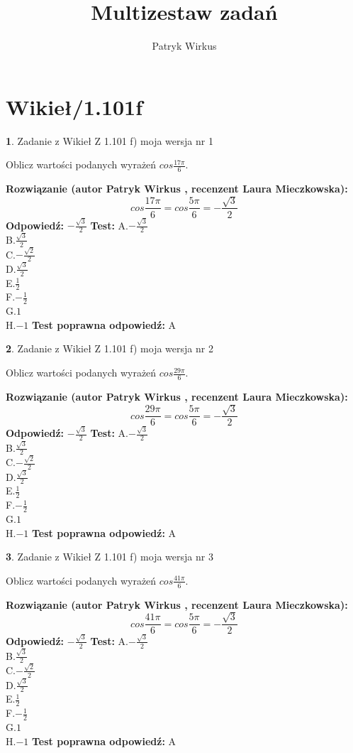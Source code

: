 \documentclass[12pt, a4paper]{article}
\title{Multizestaw zadań}
\author{Patryk Wirkus}
\date{}
\theoremstyle{definition} %
\newtheorem{zad}{}
\newcommand{\kategoria}[1]{\section{#1}}
\newcommand{\zadStart}[1]{\begin{zad}#1\newline}
\newcommand{\zadStop}{\end{zad}}
\newcommand{\rozwStart}[2]{\noindent \textbf{Rozwiązanie (autor #1 , recenzent #2): }\newline}
\newcommand{\rozwStop}{\newline}
\newcommand{\odpStart}{\noindent \textbf{Odpowiedź:}\newline}
\newcommand{\odpStop}{\newline}
\newcommand{\testStart}{\noindent \textbf{Test:}\newline}
\newcommand{\testStop}{\newline}
\newcommand{\kluczStart}{\noindent \textbf{Test poprawna odpowiedź:}\newline}
\newcommand{\kluczStop}{\newline}
\begin{document}
\maketitle

\kategoria{Wikieł/1.101f}


\zadStart{Zadanie z Wikieł Z 1.101 f) moja wersja nr 1}

Oblicz wartości podanych wyrażeń $cos \frac{17\pi}{6}$.
\zadStop
\rozwStart{Patryk Wirkus}{Laura Mieczkowska}
$$cos \frac{17\pi}{6} = cos \frac{5\pi}{6} = -\frac{\sqrt{3}}{2}$$
\rozwStop
\odpStart
$-\frac{\sqrt{3}}{2}$
\odpStop
\testStart
A.$-\frac{\sqrt{3}}{2}$\\
B.$\frac{\sqrt{3}}{2}$\\
C.$-\frac{\sqrt{2}}{2}$\\
D.$\frac{\sqrt{3}}{2}$\\
E.$\frac{1}{2}$\\
F.$-\frac{1}{2}$\\
G.$1$\\
H.$-1$
\testStop
\kluczStart
A
\kluczStop



\zadStart{Zadanie z Wikieł Z 1.101 f) moja wersja nr 2}

Oblicz wartości podanych wyrażeń $cos \frac{29\pi}{6}$.
\zadStop
\rozwStart{Patryk Wirkus}{Laura Mieczkowska}
$$cos \frac{29\pi}{6} = cos \frac{5\pi}{6} = -\frac{\sqrt{3}}{2}$$
\rozwStop
\odpStart
$-\frac{\sqrt{3}}{2}$
\odpStop
\testStart
A.$-\frac{\sqrt{3}}{2}$\\
B.$\frac{\sqrt{3}}{2}$\\
C.$-\frac{\sqrt{2}}{2}$\\
D.$\frac{\sqrt{3}}{2}$\\
E.$\frac{1}{2}$\\
F.$-\frac{1}{2}$\\
G.$1$\\
H.$-1$
\testStop
\kluczStart
A
\kluczStop



\zadStart{Zadanie z Wikieł Z 1.101 f) moja wersja nr 3}

Oblicz wartości podanych wyrażeń $cos \frac{41\pi}{6}$.
\zadStop
\rozwStart{Patryk Wirkus}{Laura Mieczkowska}
$$cos \frac{41\pi}{6} = cos \frac{5\pi}{6} = -\frac{\sqrt{3}}{2}$$
\rozwStop
\odpStart
$-\frac{\sqrt{3}}{2}$
\odpStop
\testStart
A.$-\frac{\sqrt{3}}{2}$\\
B.$\frac{\sqrt{3}}{2}$\\
C.$-\frac{\sqrt{2}}{2}$\\
D.$\frac{\sqrt{3}}{2}$\\
E.$\frac{1}{2}$\\
F.$-\frac{1}{2}$\\
G.$1$\\
H.$-1$
\testStop
\kluczStart
A
\kluczStop
\end{document}
